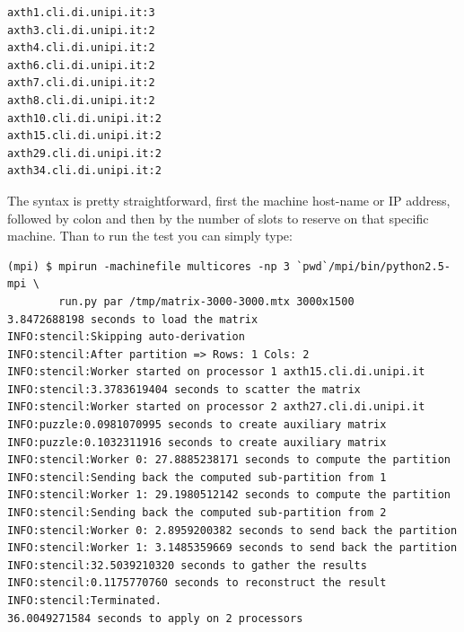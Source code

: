 \begin{verbatim}
axth1.cli.di.unipi.it:3
axth3.cli.di.unipi.it:2
axth4.cli.di.unipi.it:2
axth6.cli.di.unipi.it:2
axth7.cli.di.unipi.it:2
axth8.cli.di.unipi.it:2
axth10.cli.di.unipi.it:2
axth15.cli.di.unipi.it:2
axth29.cli.di.unipi.it:2
axth34.cli.di.unipi.it:2
\end{verbatim}

The syntax is pretty straightforward, first the machine host-name or IP
address, followed by colon and then by the number of slots to reserve on
that specific machine. Than to run the test you can simply type:

\begin{verbatim}
(mpi) $ mpirun -machinefile multicores -np 3 `pwd`/mpi/bin/python2.5-mpi \
        run.py par /tmp/matrix-3000-3000.mtx 3000x1500
3.8472688198 seconds to load the matrix
INFO:stencil:Skipping auto-derivation
INFO:stencil:After partition => Rows: 1 Cols: 2
INFO:stencil:Worker started on processor 1 axth15.cli.di.unipi.it
INFO:stencil:3.3783619404 seconds to scatter the matrix
INFO:stencil:Worker started on processor 2 axth27.cli.di.unipi.it
INFO:puzzle:0.0981070995 seconds to create auxiliary matrix
INFO:puzzle:0.1032311916 seconds to create auxiliary matrix
INFO:stencil:Worker 0: 27.8885238171 seconds to compute the partition
INFO:stencil:Sending back the computed sub-partition from 1
INFO:stencil:Worker 1: 29.1980512142 seconds to compute the partition
INFO:stencil:Sending back the computed sub-partition from 2
INFO:stencil:Worker 0: 2.8959200382 seconds to send back the partition
INFO:stencil:Worker 1: 3.1485359669 seconds to send back the partition
INFO:stencil:32.5039210320 seconds to gather the results
INFO:stencil:0.1175770760 seconds to reconstruct the result
INFO:stencil:Terminated.
36.0049271584 seconds to apply on 2 processors
\end{verbatim}
